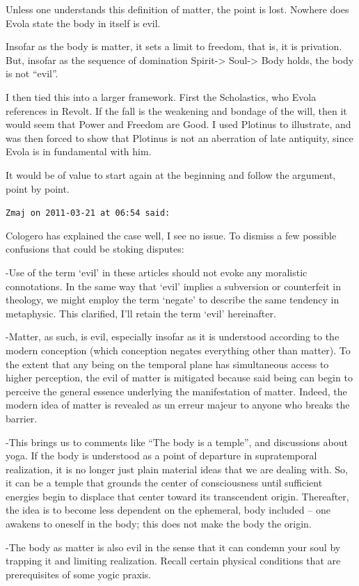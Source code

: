 \begin{footnotesize}
\begin{sffamily}
Unless one understands this definition of matter, the point is lost. Nowhere does Evola state the body in itself is evil.

Insofar as the body is matter, it sets a limit to freedom, that is, it is privation. But, insofar as the sequence of domination Spirit-> Soul-> Body holds, the body is not ``evil''.

I then tied this into a larger framework. First the Scholastics, who Evola references in Revolt. If the fall is the weakening and bondage of the will, then it would seem that Power and Freedom are Good. I used Plotinus to illustrate, and was then forced to show that Plotinus is not an aberration of late antiquity, since Evola is in fundamental with him.

It would be of value to start again at the beginning and follow the argument, point by point.

\hfill

\texttt{Zmaj on 2011-03-21 at 06:54 said:}

Cologero has explained the case well, I see no issue. To dismiss a few possible confusions that could be stoking disputes:

-Use of the term `evil' in these articles should not evoke any moralistic connotations. In the same way that `evil' implies a subversion or counterfeit in theology, we might employ the term `negate' to describe the same tendency in metaphysic. This clarified, I'll retain the term `evil' hereinafter.

-Matter, as such, is evil, especially insofar as it is understood according to the modern conception (which conception negates everything other than matter). To the extent that any being on the temporal plane has simultaneous access to higher perception, the evil of matter is mitigated because said being can begin to perceive the general essence underlying the manifestation of matter. Indeed, the modern idea of matter is revealed as un erreur majeur to anyone who breaks the barrier.

-This brings us to comments like ``The body is a temple'', and discussions about yoga. If the body is understood as a point of departure in supratemporal realization, it is no longer just plain material ideas that we are dealing with. So, it can be a temple that grounds the center of consciousness until sufficient energies begin to displace that center toward its transcendent origin. Thereafter, the idea is to become less dependent on the ephemeral, body included -- one awakens to oneself in the body; this does not make the body the origin.

-The body as matter is also evil in the sense that it can condemn your soul by trapping it and limiting realization. Recall certain physical conditions that are prerequisites of some yogic praxis.

\hfill

\end{sffamily}
\end{footnotesize}

